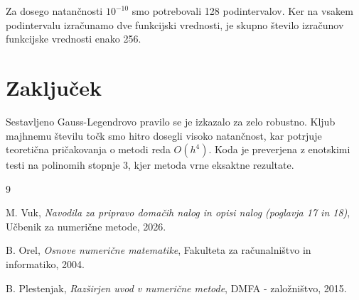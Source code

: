 \documentclass[11pt, a4paper]{article}
\begin{document}
Za dosego natančnosti $10^{-10}$ smo potrebovali 128 podintervalov. Ker na vsakem podintervalu izračunamo dve funkcijski vrednosti, je skupno število izračunov funkcijske vrednosti enako 256.

\section{Zaključek}
Sestavljeno Gauss-Legendrovo pravilo se je izkazalo za zelo robustno. Kljub majhnemu številu točk smo hitro dosegli visoko natančnost, kar potrjuje teoretična pričakovanja o metodi reda $O(h^4)$. Koda je preverjena z enotskimi testi na polinomih stopnje 3, kjer metoda vrne eksaktne rezultate.

\begin{thebibliography}{9}

M. Vuk, \textit{Navodila za pripravo domačih nalog in opisi nalog (poglavja 17 in 18)}, Učbenik za numerične metode, 2026.

B. Orel, \textit{Osnove numerične matematike}, Fakulteta za računalništvo in informatiko, 2004.

B. Plestenjak, \textit{Razširjen uvod v numerične metode}, DMFA - založništvo, 2015.

\end{thebibliography}
\end{document}
